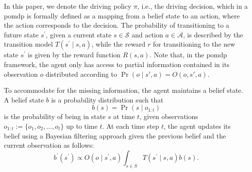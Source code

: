 In this paper, we denote the driving policy $\pi$, i.e., the driving decision, which in a \gls{pomdp} is formally defined as a mapping from a belief state to an action, where the action corresponds to the decision. The probability of transitioning to a future state $s^\prime$, given a current state $s \in \mathcal{S}$ and action $a \in \mathcal{A}$, is described by the transition model $T(s^\prime \mid s,a)$, while the reward $r$  for transitioning to the new state $s^\prime$ is given by the reward function $R(s,a)$.
Note that, in the \gls{pomdp} framework, the agent only has access to partial information contained in its observation $o$ distributed according to $\Pr(o \mid s', a) = O(o, s', a)$.

To accommodate for the missing information, the agent maintains a belief state. A belief state $b$ is a probability distribution such that 
\begin{equation}
b(s) = \Pr(s \mid o_{1:t})
\label{eq:belief_state}
\end{equation}
is the probability of being in state $s$ at time $t$, given observations $o_{1:t}:=\{o_1,o_2,...,o_t\}$ up to time $t$. 
At each time step $t$, the agent updates its belief using a Bayesian filtering approach given the previous belief and the current observation as follows:
\begin{equation}
    b^\prime(s^\prime) \propto O(o \mid s^\prime, a) \int_{s \in S}T(s^\prime \mid s,a)b(s).
\end{equation}

